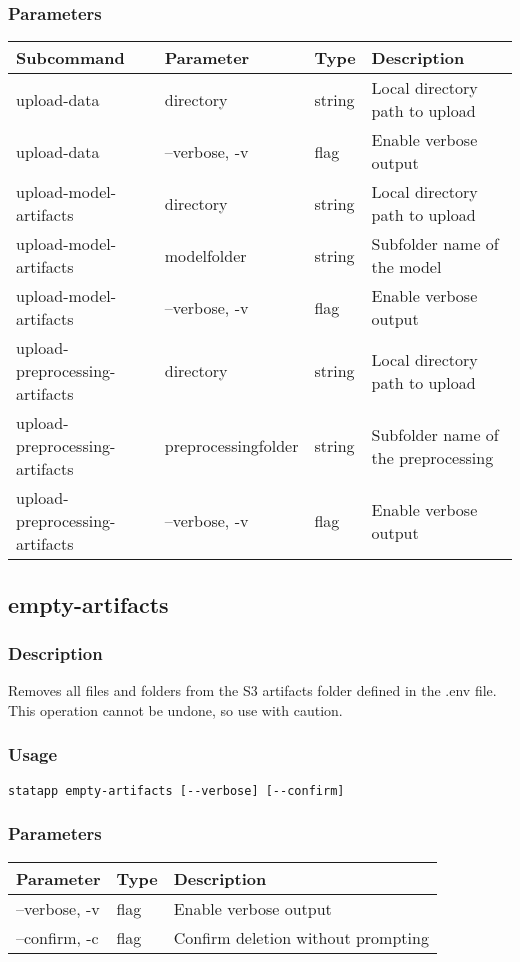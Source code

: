 \documentclass{article}
\begin{document}
\subsubsection{Parameters}
\begin{tabulary}{\linewidth}{LLLL}
\toprule
\textbf{Subcommand} & \textbf{Parameter} & \textbf{Type} & \textbf{Description} \\
\midrule
upload-data & directory & string & Local directory path to upload \\
upload-data & --verbose, -v & flag & Enable verbose output \\
\midrule
upload-model-artifacts & directory & string & Local directory path to upload \\
upload-model-artifacts & modelfolder & string & Subfolder name of the model \\
upload-model-artifacts & --verbose, -v & flag & Enable verbose output \\
\midrule
upload-preprocessing-artifacts & directory & string & Local directory path to upload \\
upload-preprocessing-artifacts & preprocessingfolder & string & Subfolder name of the preprocessing \\
upload-preprocessing-artifacts & --verbose, -v & flag & Enable verbose output \\
\bottomrule
\end{tabulary}

\subsection{empty-artifacts}
\subsubsection{Description}
Removes all files and folders from the S3 artifacts folder defined in the .env file. This operation cannot be undone, so use with caution.

\subsubsection{Usage}
\begin{lstlisting}
statapp empty-artifacts [--verbose] [--confirm]
\end{lstlisting}

\subsubsection{Parameters}
\begin{tabulary}{\linewidth}{LLL}
\toprule
\textbf{Parameter} & \textbf{Type} & \textbf{Description} \\
\midrule
--verbose, -v & flag & Enable verbose output \\
--confirm, -c & flag & Confirm deletion without prompting \\
\bottomrule
\end{tabulary}
\end{document}
